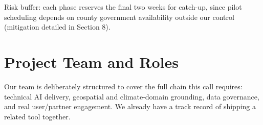 \documentclass[12pt,a4paper]{article}
\begin{document}
Risk buffer: each phase reserves the final two weeks for catch-up, since pilot scheduling depends on county government availability outside our control (mitigation detailed in Section 8).

\newpage
\section{Project Team and Roles}

Our team is deliberately structured to cover the full chain this call requires: technical AI delivery, geospatial and climate-domain grounding, data governance, and real user/partner engagement. We already have a track record of shipping a related tool together.
\end{document}
